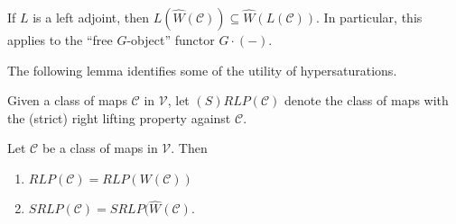 \documentclass[a4paper,10p,draft]{article}%
\numberwithin{equation}{section}%
\begin{document}
\begin{remark}
      If $L$ is a left adjoint, then $L(\hat{W}(\mathcal C)) \subseteq \hat{W}(L(\mathcal C))$.
      In particular, this applies to the ``free $G$-object'' functor $G \cdot (-)$.
\end{remark}

The following lemma identifies some of the utility of hypersaturations.
\begin{definition}
      Given a class of maps $\mathcal C$ in $\mathcal V$, let $(S)RLP(\mathcal C)$ denote the class of maps with the
      (strict) right lifting property against $\mathcal C$.
\end{definition}
\begin{lemma}
      Let $\mathcal C$ be a class of maps in $\mathcal V$. Then
      \begin{enumerate}
      \item $RLP(\mathcal C) = RLP(W(\mathcal C))$
      \item $SRLP(\mathcal C) = SRLP(\hat{W}(\mathcal C)$.
      \end{enumerate}
\end{lemma}
\end{document}
